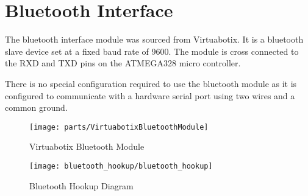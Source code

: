 \chapter{Bluetooth Interface}

The bluetooth interface module was sourced from Virtuabotix.  It is a bluetooth slave device set at a fixed baud rate of 9600.  The module is cross connected to the RXD and TXD pins on the ATMEGA328 micro controller.

There is no special configuration required to use the bluetooth module as it is configured to communicate with a hardware serial port using two wires and a common ground.

\begin{figure}[h]
  \texttt{[image: parts/VirtuabotixBluetoothModule]}
  \centering
  \caption{Virtuabotix Bluetooth Module}
  \label{fig:bluetooth_module}
\end{figure}

\begin{figure}[h]
  \texttt{[image: bluetooth\_hookup/bluetooth\_hookup]}
  \centering
  \caption{Bluetooth Hookup Diagram}
  \label{fig:bluetooth_hookup_diagram}
\end{figure}
